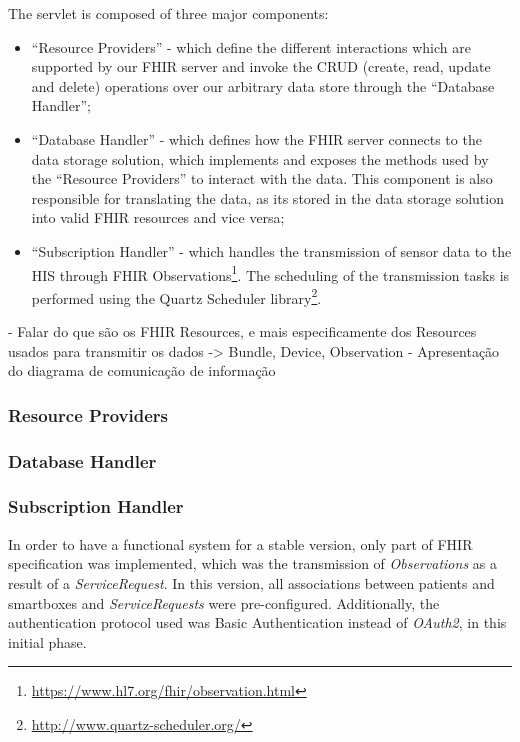 The servlet is composed of three major components:
\begin{itemize}
    \item ``Resource Providers'' - which define the different interactions which are supported by our \acs{FHIR} server and invoke the CRUD (create, read, update and delete) operations over our arbitrary data store through the ``Database Handler'';
    \item ``Database Handler'' - which defines how the \acs{FHIR} server connects to the data storage solution, which implements and exposes the methods used by the ``Resource Providers'' to interact with the data. This component is also responsible for translating the data, as its stored in the data storage solution into valid \acs{FHIR} resources and vice versa;
    \item ``Subscription Handler'' - which handles the transmission of sensor data to the \acs{HIS} through \acs{FHIR} Observations\footnote{\url{https://www.hl7.org/fhir/observation.html}}. The scheduling of the transmission tasks is performed using the Quartz Scheduler library\footnote{\url{http://www.quartz-scheduler.org/}}.
\end{itemize}


- Falar do que são os FHIR Resources, e mais especificamente dos Resources usados para transmitir os dados -> Bundle, Device, Observation
- Apresentação do diagrama de comunicação de informação

\subsubsection{Resource Providers}

\subsubsection{Database Handler}

\subsubsection{Subscription Handler}
In order to have a functional system for a stable version, only part of FHIR specification was implemented, which was the transmission of \textit{Observations} as a result of a \textit{ServiceRequest}. In this version, all associations between patients and smartboxes and \textit{ServiceRequests} were pre-configured. Additionally, the authentication protocol used was Basic Authentication instead of \textit{OAuth2}, in this initial phase.

